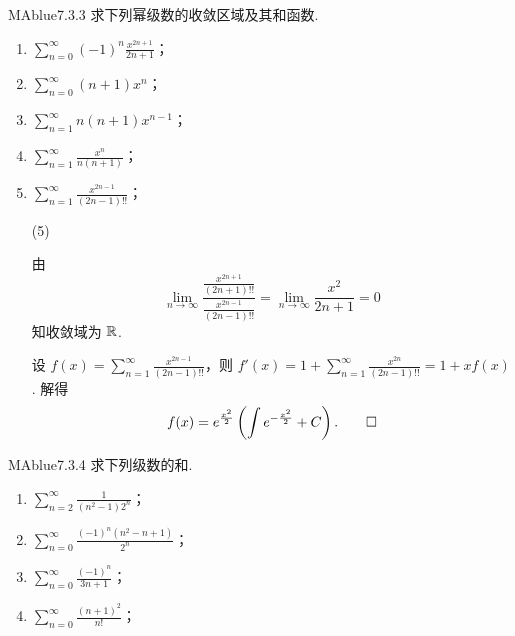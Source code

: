 \begin{problem}{MAblue}{7.3.3}
    求下列幂级数的收敛区域及其和函数.
    \begin{multicols}{2}
        \begin{enumerate}[label={(\arabic*)}]
            \item $\displaystyle \sum_{n=0}^\infty (-1)^n \frac{x^{2n+1}}{2n+1}$；
            \item $\displaystyle \sum_{n=0}^\infty (n+1)x^n$；
            \item $\displaystyle \sum_{n=1}^\infty n(n+1)x^{n-1}$；
            \item $\displaystyle \sum_{n=1}^\infty \frac{x^n}{n(n+1)}$；
            \item $\displaystyle \sum_{n=1}^\infty \frac{x^{2n-1}}{(2n-1)!!}$；
        \end{enumerate}
    \end{multicols}
\end{problem}

\begin{enumerate}
    \item[(5)]
    \begin{solution}
        由
        \[
            \lim_{n \to \infty} \frac{\frac{x^{2n+1}}{(2n+1)!!}}{\frac{x^{2n-1}}{(2n-1)!!}} = \lim_{n \to \infty} \frac{x^2}{2n+1} = 0
        \]
        知收敛域为 $\mathbb R$.
        
        设 $f(x) = \sum_{n=1}^{\infty} \frac{x^{2n-1}}{(2n-1)!!}$，则 $f'(x) = 1 + \sum_{n=1}^{\infty} \frac{x^{2n}}{(2n-1)!!} = 1 + xf(x)$. 解得
        \[
            f(x) = e^{\frac {x^2} 2} \left( \int e^{-\frac {x^2} 2} + C \right). \qedhere
        \]
    \end{solution}
\end{enumerate}

\begin{problem}{MAblue}{7.3.4}
    求下列级数的和.
    \begin{multicols}{2}
        \begin{enumerate}[label={(\arabic*)}]
            \item $\displaystyle \sum_{n=2}^\infty \frac 1 {(n^2-1)2^n}$；
            \item $\displaystyle \sum_{n=0}^\infty \frac{(-1)^n(n^2-n+1)}{2^n}$；
            \item $\displaystyle \sum_{n=0}^\infty \frac{(-1)^n}{3n+1}$；
            \item $\displaystyle \sum_{n=0}^\infty \frac{(n+1)^2}{n!}$；
        \end{enumerate}
    \end{multicols}
\end{problem}


